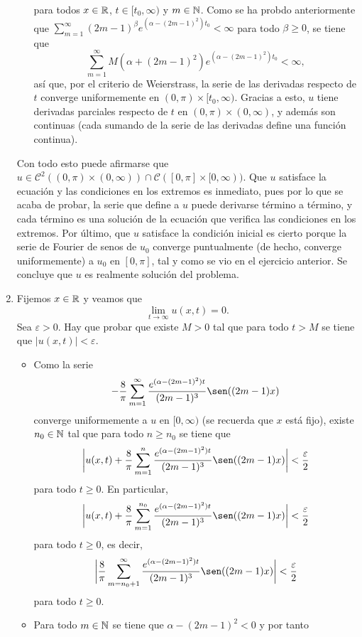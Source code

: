 \documentclass[a4paper, 12pt, extrafontsizes]{memoir}
\begin{document}
\begin{solution}
\begin{enumerate}
\begin{itemize}
        para todos $x \in \mathbb R$, $t \in [t_0,\infty)$ y $m \in \mathbb N$. Como se ha probdo anteriormente que $\sum_{m=1}^\infty (2m-1)^\beta e^{(\alpha-(2m-1)^2)t_0} < \infty$ para todo $\beta \geq 0$, se tiene que
        \[\sum_{m=1}^\infty M(\alpha+(2m-1)^2)e^{(\alpha-(2m-1)^2)t_0} < \infty,\]
        así que, por el criterio de Weierstrass, la serie de las derivadas respecto de $t$ converge uniformemente en $(0,\pi) \times [t_0,\infty)$. Gracias a esto, $u$ tiene derivadas parciales respecto de $t$ en $(0,\pi) \times (0,\infty)$, y además son continuas (cada sumando de la serie de las derivadas define una función continua).
    \end{itemize}
    Con todo esto puede afirmarse que $u \in \mathcal{C}^2((0,\pi) \times (0,\infty)) \cap \mathcal{C}([0,\pi] \times [0,\infty))$. Que $u$ satisface la ecuación y las condiciones en los extremos es inmediato, pues por lo que se acaba de probar, la serie que define a $u$ puede derivarse término a término, y cada término es una solución de la ecuación que verifica las condiciones en los extremos. Por último, que $u$ satisface la condición inicial es cierto porque la serie de Fourier de senos de $u_0$ converge puntualmente (de hecho, converge uniformemente) a $u_0$ en $[0,\pi]$, tal y como se vio en el ejercicio anterior. Se concluye que $u$ es realmente solución del problema.
    \item Fijemos $x \in \mathbb R$ y veamos que
    \[\lim_{t \to \infty} u(x,t) = 0.\]
    Sea $\varepsilon > 0$. Hay que probar que existe $M > 0$ tal que para todo $t > M$ se tiene que $|u(x,t)| < \varepsilon$.
    \begin{itemize}
        \item Como la serie
        \[-\frac{8}{\pi} \sum_{m=1}^\infty\frac{e^{(\alpha-(2m-1)^2)t}}{(2m-1)^3}\sen((2m-1)x) \]
        converge uniformemente a $u$ en $[0,\infty)$ (se recuerda que $x$ está fijo), existe $n_0 \in \mathbb N$ tal que para todo $n \geq n_0$ se tiene que
        \[\biggl|u(x,t) +\frac{8}{\pi}\sum_{m=1}^n \frac{e^{(\alpha-(2m-1)^2)t}}{(2m-1)^3}\sen((2m-1)x) \biggr| < \frac{\varepsilon}{2}\]
        para todo $t \geq 0$. En particular,
        \[\biggl|u(x,t) +\frac{8}{\pi}\sum_{m=1}^{n_0} \frac{e^{(\alpha-(2m-1)^2)t}}{(2m-1)^3}\sen((2m-1)x) \biggr| < \frac{\varepsilon}{2}\]
        para todo $t \geq 0$, es decir,
        \[\biggl|\frac{8}{\pi}\sum_{m=n_0+1}^\infty \frac{e^{(\alpha-(2m-1)^2)t}}{(2m-1)^3}\sen((2m-1)x) \biggr| < \frac{\varepsilon}{2}\]
        para todo $t \geq 0$.
        \item Para todo $m \in \mathbb N$ se tiene que $\alpha-(2m-1)^2 < 0$ y por tanto

\end{itemize}
\end{enumerate}
\end{solution}
\end{document}
